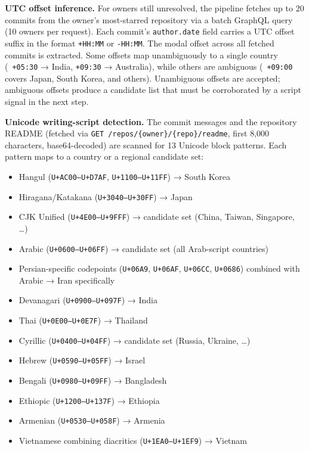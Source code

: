 \textbf{UTC offset inference.} For owners still unresolved, the pipeline fetches up to 20 commits from the owner's most-starred repository via a batch GraphQL query (10 owners per request). Each commit's \texttt{author.date} field carries a UTC offset suffix in the format \texttt{+HH:MM} or \texttt{-HH:MM}. The modal offset across all fetched commits is extracted. Some offsets map unambiguously to a single country (\eg\ \texttt{+05:30} → India, \texttt{+09:30} → Australia), while others are ambiguous (\eg\ \texttt{+09:00} covers Japan, South Korea, and others). Unambiguous offsets are accepted; ambiguous offsets produce a candidate list that must be corroborated by a script signal in the next step.

\textbf{Unicode writing-script detection.} The commit messages and the repository README (fetched via \texttt{GET /repos/\{owner\}/\{repo\}/readme}, first 8,000 characters, base64-decoded) are scanned for 13 Unicode block patterns. Each pattern maps to a country or a regional candidate set:

\begin{itemize}
  \item Hangul (\texttt{U+AC00--U+D7AF}, \texttt{U+1100--U+11FF}) → South Korea
  \item Hiragana/Katakana (\texttt{U+3040--U+30FF}) → Japan
  \item CJK Unified (\texttt{U+4E00--U+9FFF}) → candidate set (China, Taiwan, Singapore, \ldots)
  \item Arabic (\texttt{U+0600--U+06FF}) → candidate set (all Arab-script countries)
  \item Persian-specific codepoints (\texttt{U+06A9}, \texttt{U+06AF}, \texttt{U+06CC}, \texttt{U+0686}) combined with Arabic → Iran specifically
  \item Devanagari (\texttt{U+0900--U+097F}) → India
  \item Thai (\texttt{U+0E00--U+0E7F}) → Thailand
  \item Cyrillic (\texttt{U+0400--U+04FF}) → candidate set (Russia, Ukraine, \ldots)
  \item Hebrew (\texttt{U+0590--U+05FF}) → Israel
  \item Bengali (\texttt{U+0980--U+09FF}) → Bangladesh
  \item Ethiopic (\texttt{U+1200--U+137F}) → Ethiopia
  \item Armenian (\texttt{U+0530--U+058F}) → Armenia
  \item Vietnamese combining diacritics (\texttt{U+1EA0--U+1EF9}) → Vietnam
\end{itemize}

